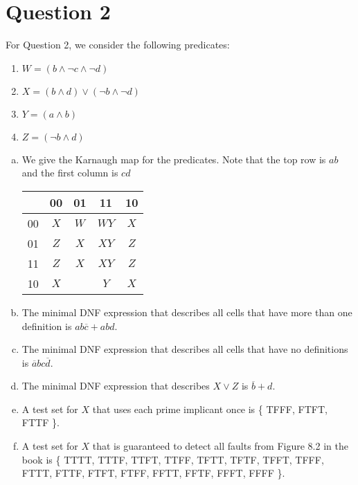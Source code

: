\documentclass{article}
\newcommand{\nota}{\overline{a}}
\newcommand{\notb}{\overline{b}}
\newcommand{\notc}{\overline{c}}
\newcommand{\notd}{\overline{d}}
\begin{document}
\newpage
\section*{Question 2}

For Question 2, we consider the following predicates:
\begin{enumerate}
	\item $ W = ( b \land \lnot c \land \lnot d ) $
	\item $ X = ( b \land d ) \lor ( \lnot b \land \lnot d) $
	\item $ Y = ( a \land b ) $
	\item $ Z = (\lnot b \land d ) $
\end{enumerate}

\begin{enumerate}[(a)]
	\item We give the Karnaugh map for the predicates. Note that the top row is $ab$ and the first column is $cd$
	\begin{center}
		\begin{tabular}{c||c|c|c|c|}
			& 00 & 01 & 11 & 10 \\
			\hline
			00 & $X$ & $W$ & $WY$ & $X$ \\
			\hline
			01 & $Z$ & $X$ & $XY$ & $Z$ \\
			\hline
			11 & $Z$ & $X$ & $XY$ & $Z$ \\
			\hline
			10 & $X$ & & $Y$ & $X$ \\
			\hline
		\end{tabular}
	\end{center}
	\item The minimal DNF expression that describes all cells that have more than one definition is $ab \notc + abd $.
	\item The minimal DNF expression that describes all cells that have no definitions is $ \nota b c \notd $.
	\item The minimal DNF expression that describes $ X \lor Z $ is $ \notb + d $.
	\item A test set for $X$ that uses each prime implicant once is \{ TFFF, FTFT, FTTF \}.
	\item A test set for $X$ that is guaranteed to detect all faults from Figure 8.2 in the book is \{ TTTT, TTTF, TTFT, TTFF, TFTT, TFTF, TFFT, TFFF, FTTT, FTTF, FTFT, FTFF, FFTT, FFTF, FFFT, FFFF \}.
\end{enumerate}
\end{document}
